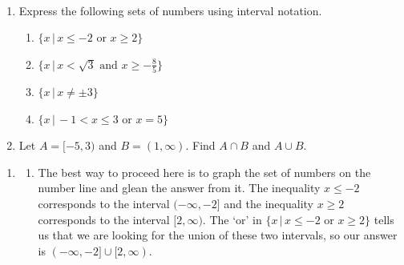 \documentclass{ximera}
\begin{document}
\begin{example}\label{intervalex} $~$

\begin{enumerate} \item Express the following sets of numbers using interval notation.

\begin{enumerate}

\item  $\{ x \, | \, x \leq -2 \, \, \text{or} \, \,  x \geq 2 \}$

\item  $\{ x \, | \, x < \sqrt{3} \,\,  \text{and} \,\, x \geq -\frac{8}{5}  \}$


\item  $\{ x \, | \, x \neq \pm 3 \}$

\item  $\{ x \, | \, -1 < x \leq 3 \,\, \text{or} \,\, x = 5\}$

\end{enumerate}



\item  Let $A = [-5,3)$ and $B = (1, \infty)$.  Find  $A \cap B$ and $A\cup B$. 

\end{enumerate}


\begin{explanation}

\begin{enumerate}

\item 

\begin{enumerate}

\item  The best way to proceed here is to graph the set of numbers on the number line and glean the answer from it.  The inequality $x \leq -2$ corresponds to the interval $(-\infty, -2]$ and the inequality $x \geq 2$ corresponds to the interval $[2, \infty)$. The `or' in $\{ x \, | \, x \leq -2 \, \, \text{or} \, \,  x \geq 2 \}$ tells us that we are looking for the union of these two intervals, so our answer is $(-\infty, -2] \cup [2, \infty)$.

\begin{center}

\end{center}
\end{enumerate}
\end{enumerate}
\end{explanation}
\end{example}
\end{document}
